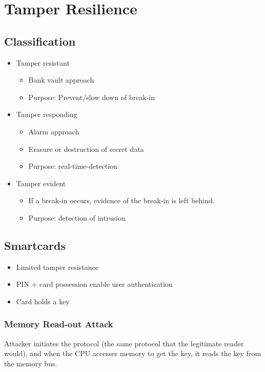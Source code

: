 
\section{Tamper Resilience}
\subsection{Classification}
\begin{itemize}
  \item Tamper resistant
    \begin{itemize}
      \item Bank vault approach
      \item Purpose: Prevent/slow down of break-in
    \end{itemize}
  \item Tamper responding
    \begin{itemize}
      \item Alarm approach
      \item Erasure or destruction of secret data
      \item Purpose: real-time-detection
    \end{itemize}
  \item Tamper evident
    \begin{itemize}
      \item If a break-in occurs, evidence of the break-in is left behind.
      \item Purpose: detection of intrusion
    \end{itemize}
\end{itemize}

\subsection{Smartcards}
\begin{itemize}
  \item Limited tamper resistance
  \item PIN + card possession enable user authentication
  \item Card holds a key
\end{itemize}
\subsubsection{Memory Read-out Attack}
Attacker initiates the protocol (the same protocol that the legitimate reader would),
and when the CPU accesses memory to get the key, it reads the key from the
memory bus.

